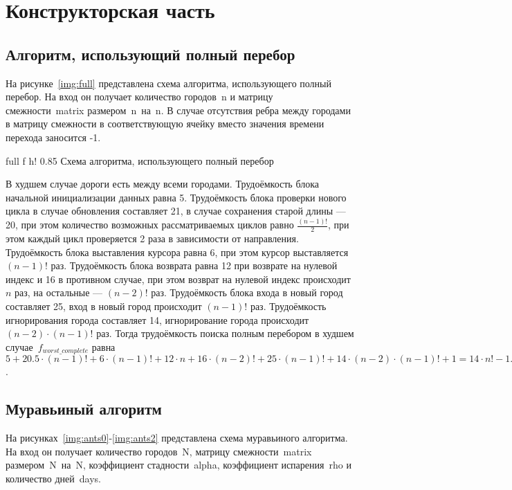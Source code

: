 \chapter{Конструкторская часть}

\section{Алгоритм, использующий полный перебор}

На рисунке~\ref{img:full} представлена схема алгоритма, использующего полный перебор. На вход он получает количество городов~n и матрицу смежности~matrix размером~n~на~n. В случае отсутствия ребра между городами в матрицу смежности в соответствующую ячейку вместо значения времени перехода заносится -1.

\FloatBarrier
{}
{full} %
{f} %
{h!} %
{0.85\textwidth} %
{Схема алгоритма, использующего полный перебор} %
\FloatBarrier

В худшем случае дороги есть между всеми городами. Трудоёмкость блока начальной инициализации данных равна 5. Трудоёмкость блока проверки нового цикла в случае обновления составляет 21, в случае сохранения старой длины --- 20, при этом количество возможных рассматриваемых циклов равно $\frac{(n-1)!}{2}$, при этом каждый цикл проверяется 2 раза в зависимости от направления. Трудоёмкость блока выставления курсора равна 6, при этом курсор выставляется $(n-1)!$ раз. Трудоёмкость блока возврата равна 12 при возврате на нулевой индекс и 16 в противном случае, при этом возврат на нулевой индекс происходит $n$ раз, на остальные --- $(n-2)!$ раз. Трудоёмкость блока входа в новый город составляет 25, вход в новый город происходит $(n-1)!$ раз. Трудоёмкость игнорирования города составляет 14, игнорирование города происходит $(n-2) \cdot (n-1)!$ раз. Тогда трудоёмкость поиска полным перебором в худшем случае~$f_{worst\_complete}$ равна $5 + 20.5 \cdot (n-1)! + 6 \cdot (n-1)! + 12 \cdot n + 16 \cdot (n-2)! + 25 \cdot (n-1)! + 14 \cdot (n-2) \cdot (n-1)! + 1 = 14 \cdot n! - 1.5 \cdot (n-1)! + 16 \cdot (n-2)! + 12 \cdot n + 1$.

\section{Муравьиный алгоритм}

На рисунках~\ref{img:ants0}-\ref{img:ants2} представлена схема муравьиного алгоритма. На вход он получает количество городов~N, матрицу смежности~matrix размером~N~на~N, коэффициент стадности~alpha, коэффициент испарения~rho и количество дней~days.

